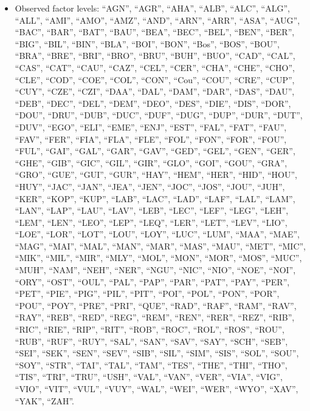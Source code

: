 \documentclass[
  letterpaper,
  DIV=11,
  numbers=noendperiod]{scrartcl}
\providecommand{\tightlist}{%
  \setlength{\itemsep}{0pt}\setlength{\parskip}{0pt}}
\begin{document}
\emini

\begin{itemize}
\tightlist
\item
  Observed factor levels: ``AGN'', ``AGR'', ``AHA'', ``ALB'', ``ALC'',
  ``ALG'', ``ALL'', ``AMI'', ``AMO'', ``AMZ'', ``AND'', ``ARN'',
  ``ARR'', ``ASA'', ``AUG'', ``BAC'', ``BAR'', ``BAT'', ``BAU'',
  ``BEA'', ``BEC'', ``BEL'', ``BEN'', ``BER'', ``BIG'', ``BIL'',
  ``BIN'', ``BLA'', ``BOI'', ``BON'', ``Bos'', ``BOS'', ``BOU'',
  ``BRA'', ``BRE'', ``BRI'', ``BRO'', ``BRU'', ``BUH'', ``BUO'',
  ``CAD'', ``CAL'', ``CAS'', ``CAT'', ``CAU'', ``CAZ'', ``CEL'',
  ``CER'', ``CHA'', ``CHE'', ``CHO'', ``CLE'', ``COD'', ``COE'',
  ``COL'', ``CON'', ``Cou'', ``COU'', ``CRE'', ``CUP'', ``CUY'',
  ``CZE'', ``CZI'', ``DAA'', ``DAL'', ``DAM'', ``DAR'', ``DAS'',
  ``DAU'', ``DEB'', ``DEC'', ``DEL'', ``DEM'', ``DEO'', ``DES'',
  ``DIE'', ``DIS'', ``DOR'', ``DOU'', ``DRU'', ``DUB'', ``DUC'',
  ``DUF'', ``DUG'', ``DUP'', ``DUR'', ``DUT'', ``DUV'', ``EGO'',
  ``ELI'', ``EME'', ``ENJ'', ``EST'', ``FAL'', ``FAT'', ``FAU'',
  ``FAV'', ``FER'', ``FIA'', ``FLA'', ``FLE'', ``FOL'', ``FON'',
  ``FOR'', ``FOU'', ``FUL'', ``GAI'', ``GAL'', ``GAR'', ``GAV'',
  ``GED'', ``GEL'', ``GEN'', ``GER'', ``GHE'', ``GIB'', ``GIC'',
  ``GIL'', ``GIR'', ``GLO'', ``GOI'', ``GOU'', ``GRA'', ``GRO'',
  ``GUE'', ``GUI'', ``GUR'', ``HAY'', ``HEM'', ``HER'', ``HID'',
  ``HOU'', ``HUY'', ``JAC'', ``JAN'', ``JEA'', ``JEN'', ``JOC'',
  ``JOS'', ``JOU'', ``JUH'', ``KER'', ``KOP'', ``KUP'', ``LAB'',
  ``LAC'', ``LAD'', ``LAF'', ``LAL'', ``LAM'', ``LAN'', ``LAP'',
  ``LAU'', ``LAV'', ``LEB'', ``LEC'', ``LEF'', ``LEG'', ``LEH'',
  ``LEM'', ``LEN'', ``LEO'', ``LEP'', ``LEQ'', ``LER'', ``LET'',
  ``LEV'', ``LIO'', ``LOE'', ``LOR'', ``LOT'', ``LOU'', ``LOY'',
  ``LUC'', ``LUM'', ``MAA'', ``MAE'', ``MAG'', ``MAI'', ``MAL'',
  ``MAN'', ``MAR'', ``MAS'', ``MAU'', ``MET'', ``MIC'', ``MIK'',
  ``MIL'', ``MIR'', ``MLY'', ``MOL'', ``MON'', ``MOR'', ``MOS'',
  ``MUC'', ``MUH'', ``NAM'', ``NEH'', ``NER'', ``NGU'', ``NIC'',
  ``NIO'', ``NOE'', ``NOI'', ``ORY'', ``OST'', ``OUL'', ``PAL'',
  ``PAP'', ``PAR'', ``PAT'', ``PAY'', ``PER'', ``PET'', ``PIE'',
  ``PIG'', ``PIL'', ``PIT'', ``POI'', ``POL'', ``PON'', ``POR'',
  ``POU'', ``POY'', ``PRE'', ``PRI'', ``QUE'', ``RAD'', ``RAF'',
  ``RAM'', ``RAV'', ``RAY'', ``REB'', ``RED'', ``REG'', ``REM'',
  ``REN'', ``RER'', ``REZ'', ``RIB'', ``RIC'', ``RIE'', ``RIP'',
  ``RIT'', ``ROB'', ``ROC'', ``ROL'', ``ROS'', ``ROU'', ``RUB'',
  ``RUF'', ``RUY'', ``SAL'', ``SAN'', ``SAV'', ``SAY'', ``SCH'',
  ``SEB'', ``SEI'', ``SEK'', ``SEN'', ``SEV'', ``SIB'', ``SIL'',
  ``SIM'', ``SIS'', ``SOL'', ``SOU'', ``SOY'', ``STR'', ``TAI'',
  ``TAL'', ``TAM'', ``TES'', ``THE'', ``THI'', ``THO'', ``TIS'',
  ``TRI'', ``TRU'', ``USH'', ``VAL'', ``VAN'', ``VER'', ``VIA'',
  ``VIG'', ``VIO'', ``VIT'', ``VUL'', ``VUY'', ``WAL'', ``WEI'',
  ``WER'', ``WYO'', ``XAV'', ``YAK'', ``ZAH''.
\end{itemize}
\end{document}
